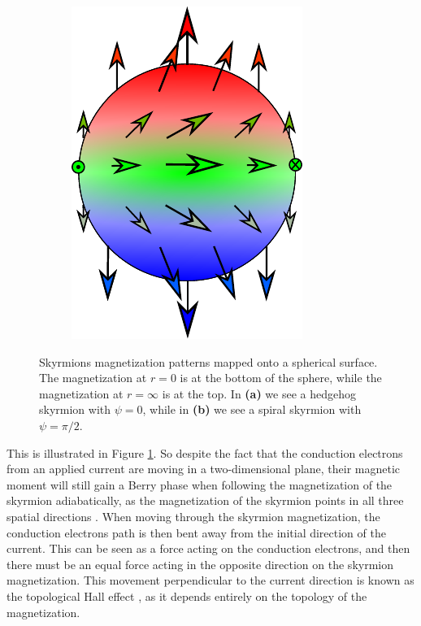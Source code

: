 \begin{figure}[h!]
\begin{subfigure}{.35\textwidth}
  \includegraphics[width=1.0\linewidth]{Figures/SpiralSphere}
  \caption{}
\end{subfigure}
\caption{Skyrmions magnetization patterns mapped onto a spherical surface. The magnetization at $r=0$ is at the bottom of the sphere, while the magnetization at $r=\infty$ is at the top. In \textbf{(a)} we see a hedgehog skyrmion with $\psi = 0$, while in \textbf{(b)} we see a spiral skyrmion with $\psi = \pi/2$.}
\label{fig:SkyrmionSphere}
\end{figure}
This is illustrated in Figure \ref{fig:SkyrmionSphere}. So despite the fact that the conduction electrons from an applied current are moving in a two-dimensional plane, their magnetic moment will still gain a Berry phase when following the magnetization of the skyrmion adiabatically, as the magnetization of the skyrmion points in all three spatial directions \cite{Tatara2007, Binz2008}. When moving through the skyrmion magnetization, the conduction electrons path is then bent away from the initial direction of the current. This can be seen as a force acting on the conduction electrons, and then there must be an equal force acting in the opposite direction on the skyrmion magnetization. This movement perpendicular to the current direction is known as the topological Hall effect \cite{Ye1999}, as it depends entirely on the topology of the magnetization.

